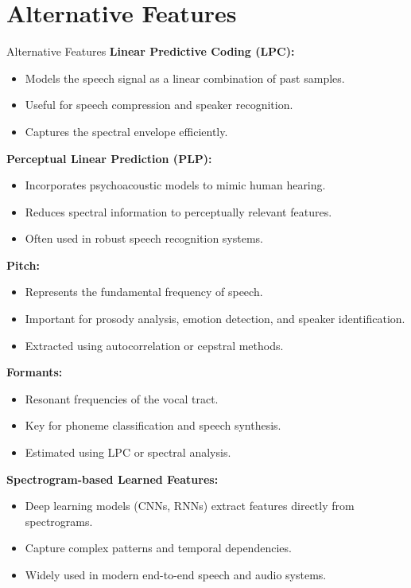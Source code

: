 \section{Alternative Features}

\begin{frame}[allowframebreaks]{Alternative Features}
\textbf{Linear Predictive Coding (LPC):}
\begin{itemize}
    \item Models the speech signal as a linear combination of past samples.
    \item Useful for speech compression and speaker recognition.
    \item Captures the spectral envelope efficiently.
\end{itemize}

\textbf{Perceptual Linear Prediction (PLP):}
\begin{itemize}
    \item Incorporates psychoacoustic models to mimic human hearing.
    \item Reduces spectral information to perceptually relevant features.
    \item Often used in robust speech recognition systems.
\end{itemize}

\textbf{Pitch:}
\begin{itemize}
    \item Represents the fundamental frequency of speech.
    \item Important for prosody analysis, emotion detection, and speaker identification.
    \item Extracted using autocorrelation or cepstral methods.
\end{itemize}

\textbf{Formants:}
\begin{itemize}
    \item Resonant frequencies of the vocal tract.
    \item Key for phoneme classification and speech synthesis.
    \item Estimated using LPC or spectral analysis.
\end{itemize}

\textbf{Spectrogram-based Learned Features:}
\begin{itemize}
    \item Deep learning models (CNNs, RNNs) extract features directly from spectrograms.
    \item Capture complex patterns and temporal dependencies.
    \item Widely used in modern end-to-end speech and audio systems.
\end{itemize}


\end{frame}
